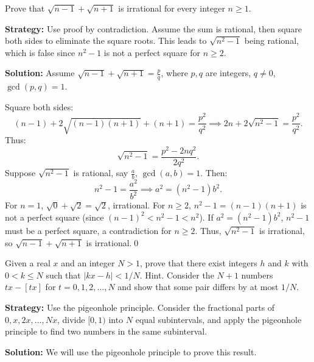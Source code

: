 \begin{problembox}
\begin{problemstatement}
Prove that $\sqrt{n - 1} + \sqrt{n + 1}$ is irrational for every integer $n \geq 1$.
\end{problemstatement}
\end{problembox}

\noindent\textbf{Strategy:} Use proof by contradiction. Assume the sum is rational, then square both sides to eliminate the square roots. This leads to $\sqrt{n^2 - 1}$ being rational, which is false since $n^2 - 1$ is not a perfect square for $n \geq 2$.

\bigskip\noindent\textbf{Solution:}
Assume $\sqrt{n - 1} + \sqrt{n + 1} = \frac{p}{q}$, where $p, q$ are integers, $q \neq 0$, $\gcd(p, q) = 1$.

Square both sides:
\[
(n - 1) + 2\sqrt{(n - 1)(n + 1)} + (n + 1) = \frac{p^2}{q^2} \implies 2n + 2\sqrt{n^2 - 1} = \frac{p^2}{q^2}.
\]
Thus:
\[
\sqrt{n^2 - 1} = \frac{p^2 - 2n q^2}{2 q^2}.
\]
Suppose $\sqrt{n^2 - 1}$ is rational, say $\frac{a}{b}$, $\gcd(a, b) = 1$. Then:
\[
n^2 - 1 = \frac{a^2}{b^2} \implies a^2 = (n^2 - 1)b^2.
\]
For $n = 1$, $\sqrt{0} + \sqrt{2} = \sqrt{2}$, irrational. For $n \geq 2$, $n^2 - 1 = (n - 1)(n + 1)$ is not a perfect square (since $(n - 1)^2 < n^2 - 1 < n^2$). If $a^2 = (n^2 - 1)b^2$, $n^2 - 1$ must be a perfect square, a contradiction for $n \geq 2$. Thus, $\sqrt{n^2 - 1}$ is irrational, so $\sqrt{n - 1} + \sqrt{n + 1}$ is irrational.\qed


\begin{problembox}
\begin{problemstatement}
Given a real $x$ and an integer $N > 1$, prove that there exist integers $h$ and $k$ with $0 < k \leq N$ such that $|kx - h| < 1/N$. Hint. Consider the $N+1$ numbers $tx-[tx]$ for $t=0,1,2,\dots,N$ and show that some pair differs by at most $1/N$.
\end{problemstatement}
\end{problembox}

\noindent\textbf{Strategy:} Use the pigeonhole principle. Consider the fractional parts of $0, x, 2x, \ldots, Nx$, divide $[0,1)$ into $N$ equal subintervals, and apply the pigeonhole principle to find two numbers in the same subinterval.

\bigskip\noindent\textbf{Solution:}
We will use the pigeonhole principle to prove this result.


